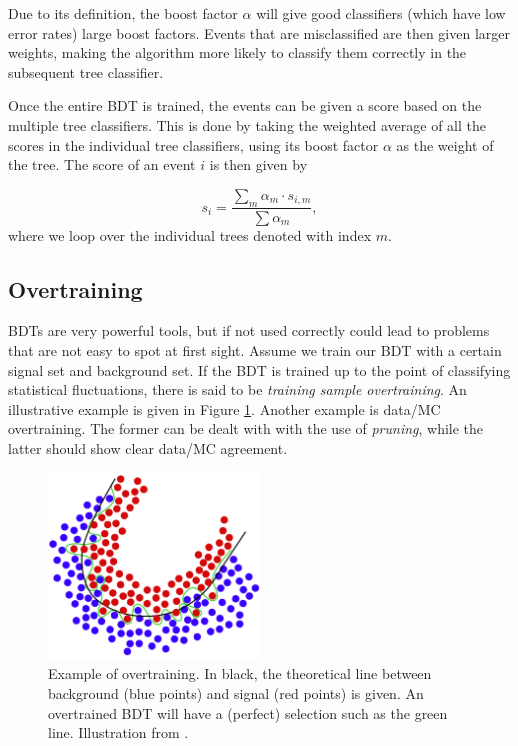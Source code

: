 Due to its definition, the boost factor $\alpha$ will give good classifiers (which have low error rates) large boost factors. Events that are misclassified are then given larger weights, making the algorithm more likely to classify them correctly in the subsequent tree classifier.

Once the entire BDT is trained, the events can be given a score based on the multiple tree classifiers. This is done by taking the weighted average of all the scores in the individual tree classifiers, using its boost factor $\alpha$ as the weight of the tree. The score of an event $i$ is then given by

\begin{equation}
s_i = \frac{\sum_m \alpha_m \cdot s_{i,m}}{\sum \alpha_m},
\end{equation}
\noindent where we loop over the individual trees denoted with index $m$.

\subsection{Overtraining}
\label{subsec:overtraining}
BDTs are very powerful tools, but if not used correctly could lead to problems that are not easy to spot at first sight. Assume we train our BDT with a certain signal set and background set. If the BDT is trained up to the point of classifying statistical fluctuations, there is said to be \textit{training sample overtraining}. An illustrative example is given in Figure \ref{fig:overtraining}. Another example is data/MC overtraining. The former can be dealt with with the use of \textit{pruning}, while the latter should show clear data/MC agreement. 

\begin{figure}[t]
\centering
\includegraphics[width=0.5\textwidth]{chapter7/img/overtraining.png}
\caption{Example of overtraining. In black, the theoretical line between background (blue points) and signal (red points) is given. An overtrained BDT will have a (perfect) selection such as the green line. Illustration from \cite{boserpdf}.}
\label{fig:overtraining}
\end{figure}

